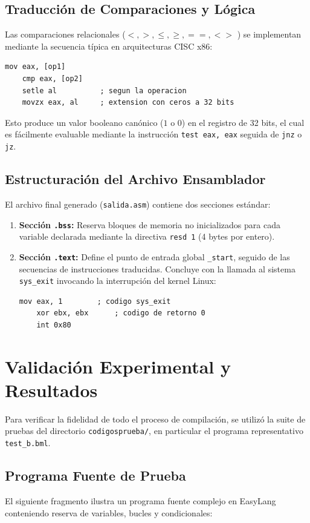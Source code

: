 \documentclass[conference]{IEEEtran}
\begin{document}
\subsection{Traducción de Comparaciones y Lógica}
Las comparaciones relacionales ($<, >, \le, \ge, ==, <>$ ) se implementan mediante la secuencia típica en arquitecturas CISC x86:
\begin{lstlisting}[language={[x86masm]Assembler}]
    mov eax, [op1]
    cmp eax, [op2]
    setle al          ; segun la operacion
    movzx eax, al     ; extension con ceros a 32 bits
\end{lstlisting}
Esto produce un valor booleano canónico ($1$ o $0$) en el registro de 32 bits, el cual es fácilmente evaluable mediante la instrucción \texttt{test eax, eax} seguida de \texttt{jnz} o \texttt{jz}.

\subsection{Estructuración del Archivo Ensamblador}
El archivo final generado (\texttt{salida.asm}) contiene dos secciones estándar:
\begin{enumerate}
    \item \textbf{Sección \texttt{.bss}:} Reserva bloques de memoria no inicializados para cada variable declarada mediante la directiva \texttt{resd 1} (4 bytes por entero).
    \item \textbf{Sección \texttt{.text}:} Define el punto de entrada global \texttt{\_start}, seguido de las secuencias de instrucciones traducidas. Concluye con la llamada al sistema \texttt{sys\_exit} invocando la interrupción del kernel Linux:
\begin{lstlisting}[language={[x86masm]Assembler}]
    mov eax, 1        ; codigo sys_exit
    xor ebx, ebx      ; codigo de retorno 0
    int 0x80
\end{lstlisting}
\end{enumerate}

\section{Validación Experimental y Resultados}
Para verificar la fidelidad de todo el proceso de compilación, se utilizó la suite de pruebas del directorio \texttt{codigosprueba/}, en particular el programa representativo \texttt{test\_b.bml}.

\subsection{Programa Fuente de Prueba}
El siguiente fragmento ilustra un programa fuente complejo en EasyLang conteniendo reserva de variables, bucles y condicionales:
\end{document}
